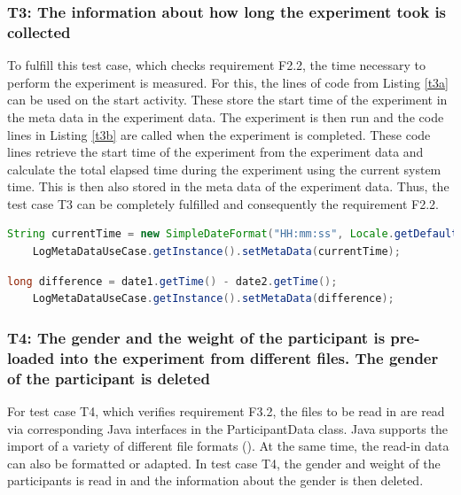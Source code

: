 \newpage\subsubsection*{T3: The information about how long the experiment took is collected}

To fulfill this test case, which checks requirement F2.2, the time necessary to perform the experiment is measured. For this, the lines of code from Listing \ref{t3a} can be used on the start activity. These store the start time of the experiment in the meta data in the experiment data. The experiment is then run and the code lines in Listing \ref{t3b} are called when the experiment is completed. These code lines retrieve the start time of the experiment from the experiment data and calculate the total elapsed time during the experiment using the current system time. This is then also stored in the meta data of the experiment data. Thus, the test case T3 can be completely fulfilled and consequently the requirement F2.2.

\vspace{1cm}

\begin{lstlisting}[language=java,label=t3a,lineskip={0pt}, caption=Collect time needed to conduct experiment (a), basicstyle=\scriptsize, captionpos=b]
    String currentTime = new SimpleDateFormat("HH:mm:ss", Locale.getDefault()).format(new Date());
    LogMetaDataUseCase.getInstance().setMetaData(currentTime);
\end{lstlisting}

\begin{lstlisting}[language=java,label=t3b,lineskip={0pt}, caption=Collect time needed to conduct experiment (b), basicstyle=\scriptsize, captionpos=b]
    long difference = date1.getTime() - date2.getTime();
    LogMetaDataUseCase.getInstance().setMetaData(difference);
\end{lstlisting}


\newpage\subsubsection*{T4: The gender and the weight of the participant is pre-loaded into the experiment from different files. The gender of the participant is deleted}

For test case T4, which verifies requirement F3.2, the files to be read in are read via corresponding Java interfaces in the ParticipantData class. Java supports the import of a variety of different file formats (\cite{Ullenboom.2017}). At the same time, the read-in data can also be formatted or adapted. In test case T4, the gender and weight of the participants is read in and the information about the gender is then deleted.

